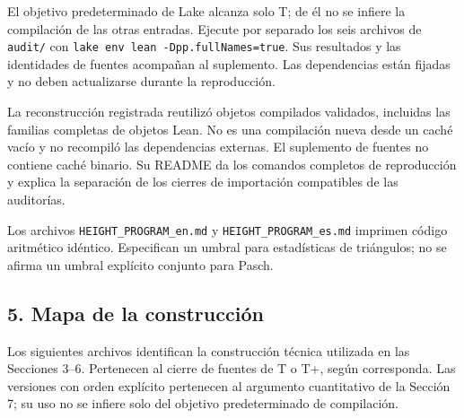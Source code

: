 \documentclass[spanish,11pt,a4paper]{article}
\begin{document}
El objetivo predeterminado de Lake alcanza solo T; de él no se infiere la compilación de las otras entradas. Ejecute por separado los seis archivos de \texttt{audit/\allowbreak{}} con \texttt{lake\ env\ lean\ -Dpp.\allowbreak{}full\allowbreak{}Names=true}. Sus resultados y las identidades de fuentes acompañan al suplemento. Las dependencias están fijadas y no deben actualizarse durante la reproducción.

La reconstrucción registrada reutilizó objetos compilados validados, incluidas las familias completas de objetos Lean. No es una compilación nueva desde un caché vacío y no recompiló las dependencias externas. El suplemento de fuentes no contiene caché binario. Su README da los comandos completos de reproducción y explica la separación de los cierres de importación compatibles de las auditorías.

Los archivos \texttt{HEIGHT\_\allowbreak{}PROGRAM\_\allowbreak{}en.\allowbreak{}md} y \texttt{HEIGHT\_\allowbreak{}PROGRAM\_\allowbreak{}es.\allowbreak{}md} imprimen código aritmético idéntico. Especifican un umbral para estadísticas de triángulos; no se afirma un umbral explícito conjunto para Pasch.

\subsection{5. Mapa de la construcción}\label{mapa-de-la-construcciuxf3n}

Los siguientes archivos identifican la construcción técnica utilizada en las Secciones 3--6. Pertenecen al cierre de fuentes de T o T+, según corresponda. Las versiones con orden explícito pertenecen al argumento cuantitativo de la Sección 7; su uso no se infiere solo del objetivo predeterminado de compilación.
\end{document}
